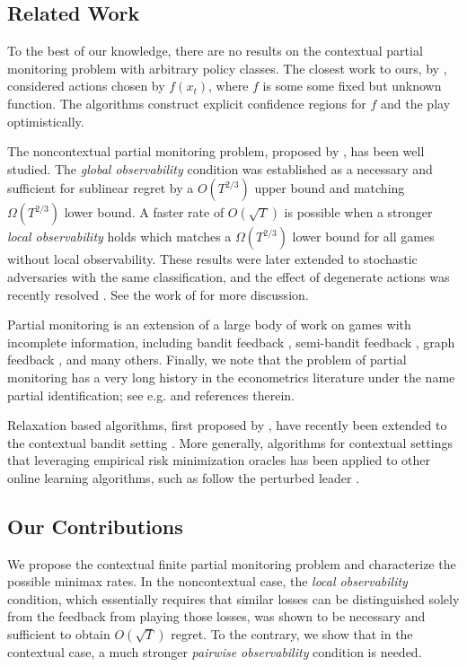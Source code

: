 \documentclass{article}
\begin{document}
\subsection{Related Work}
To the best of our knowledge, there are no results on the contextual partial monitoring problem with arbitrary policy classes. The closest work to ours, by \citet{bartok2012partial}, considered actions chosen by $f(x_t)$, where $f$ is some some fixed but unknown function. The algorithms construct explicit confidence regions for $f$ and the play optimistically. 

The noncontextual partial monitoring problem, proposed by \citet{piccolboni2001discrete}, has been well studied. The \emph{global observability} condition was established as a necessary and sufficient for sublinear regret \cite{cesa2006regret} by a $O(T^{2/3})$ upper bound and matching $\Omega(T^{2/3})$ lower bound. A faster rate of $O(\sqrt{T})$ is possible when a stronger \emph{local observability} holds \cite{bartok2011minimax} which matches a $\Omega(T^{2/3})$ lower bound for all games without local observability. These results were later extended to stochastic adversaries \cite{foster2012no} with the same classification, and the effect of degenerate actions was recently resolved \cite{lattimore2018cleaning}. See the work of \citet{bartok2014partial} for more discussion.

Partial monitoring is an extension of a large body of work on games with incomplete information, including bandit feedback \cite{bubeck2012regret}, semi-bandit feedback \cite{audibert2013regret}, graph feedback \cite{alon2015online}, and many others. Finally, we note that the problem of partial monitoring has a very long history in the econometrics literature under the name partial identification; see e.g. \cite{marschak1944random,manski2009identification} and references therein.

Relaxation based algorithms, first proposed by \citet{rakhlinrelax}, have recently been extended to the contextual bandit setting \cite{rakhlin2016bistro,syrgkanis2016improved}. More generally, algorithms for contextual settings that leveraging empirical risk minimization oracles has been applied to other online learning algorithms, such as follow the perturbed leader \cite{dudik2016oracle}.


\subsection{Our Contributions}
We propose the contextual finite partial monitoring problem and characterize the possible minimax rates. In the noncontextual case, the \emph{local observability} condition, which essentially requires that similar losses can be distinguished solely from the feedback from playing those losses, was shown to be necessary and sufficient to obtain $O(\sqrt{T})$ regret. To the contrary, we show that in the contextual case, a much stronger \emph{pairwise observability} condition is needed.
\end{document}
